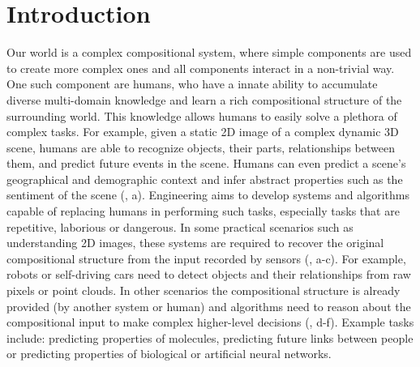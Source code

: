 \chapter{Introduction\label{sec:intro}}


Our world is a complex compositional system, where simple components are used to create more complex ones and all components interact in a non-trivial way. 
One such component are humans, who have a innate ability to accumulate diverse multi-domain knowledge and learn a rich compositional structure of the surrounding world.
This knowledge allows humans to easily solve a plethora of complex tasks. For example, given a static 2D image of a complex dynamic 3D scene, humans are able to recognize objects, their parts, relationships between them, and predict future events in the scene. Humans can even predict a scene's geographical and demographic context and infer abstract properties such as the sentiment of the scene (\fig{\ref{fig:intro_apps}}, a).
Engineering aims to develop systems and algorithms capable of replacing humans in performing such tasks, especially tasks that are repetitive, laborious or dangerous.
In some practical scenarios such as understanding 2D images, these systems are required to recover the original compositional structure from the input recorded by sensors (\fig{\ref{fig:intro_apps}}, a-c). For example, robots or self-driving cars need to detect objects and their relationships from raw pixels or point clouds. In other scenarios the compositional structure is already provided (\eg by another system or human) and algorithms need to reason about the compositional input to make complex higher-level decisions (\fig{\ref{fig:intro_apps}}, d-f). Example tasks include: predicting properties of molecules, predicting future links between people or predicting properties of biological or artificial neural networks.



